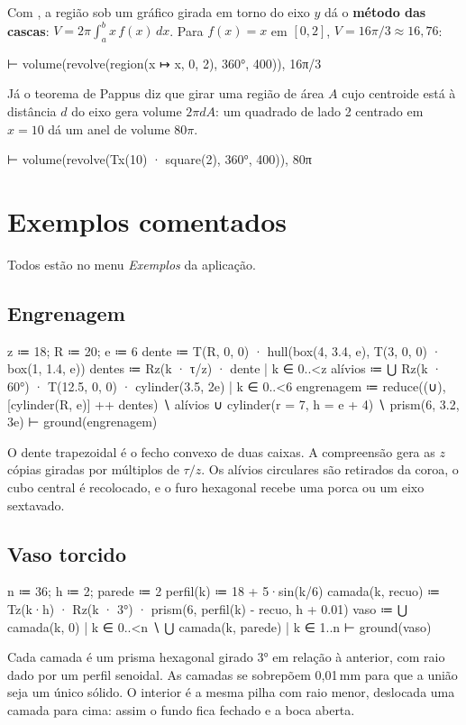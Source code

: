 Com , a região sob um gráfico girada em torno do eixo $y$ dá o \textbf{método das cascas}:
$V = 2\pi\int_a^b x\,f(x)\,dx$. Para $f(x) = x$ em $[0, 2]$, $V = 16\pi/3 \approx 16{,}76$:
\begin{csg}[run]
⊢ volume(revolve(region(x ↦ x, 0, 2), 360°, 400)), 16π/3
\end{csg}
Já o teorema de Pappus diz que girar uma região de área $A$ cujo centroide está à distância $d$ do eixo gera volume
$2\pi d A$: um quadrado de lado 2 centrado em $x = 10$ dá um anel de volume $80\pi$.
\begin{csg}[run]
⊢ volume(revolve(Tx(10) · square(2), 360°, 400)), 80π
\end{csg}

\section{Exemplos comentados}\label{sec:exemplos}
Todos estão no menu \emph{Exemplos} da aplicação.

\subsection{Engrenagem}
\begin{csg}[run, id=gear]
z ≔ 18; R ≔ 20; e ≔ 6
dente  ≔ T(R, 0, 0) · hull(box(4, 3.4, e), T(3, 0, 0) · box(1, 1.4, e))
dentes ≔ { Rz(k · τ/z) · dente | k ∈ 0..<z }
alívios ≔ ⋃{ Rz(k · 60°) · T(12.5, 0, 0) · cylinder(3.5, 2e) | k ∈ 0..<6 }
engrenagem ≔ reduce((∪), [cylinder(R, e)] ++ dentes)
  ∖ alívios ∪ cylinder(r = 7, h = e + 4) ∖ prism(6, 3.2, 3e)
⊢ ground(engrenagem)
\end{csg}
O dente trapezoidal é o fecho convexo de duas caixas. A compreensão gera as $z$ cópias giradas por múltiplos de
$\tau/z$. Os alívios circulares são retirados da coroa, o cubo central é recolocado, e o furo hexagonal recebe uma porca ou um eixo sextavado.

\subsection{Vaso torcido}
\begin{csg}[run, id=vase]
n ≔ 36; h ≔ 2; parede ≔ 2
perfil(k) ≔ 18 + 5·sin(k/6)
camada(k, recuo) ≔ Tz(k·h) · Rz(k · 3°) · prism(6, perfil(k) - recuo, h + 0.01)
vaso ≔ ⋃{ camada(k, 0) | k ∈ 0..<n } ∖ ⋃{ camada(k, parede) | k ∈ 1..n }
⊢ ground(vaso)
\end{csg}
Cada camada é um prisma hexagonal girado 3° em relação à anterior, com raio dado por um perfil senoidal. As camadas se sobrepõem
0,01\,mm para que a união seja um único sólido. O interior é a mesma pilha com raio menor, deslocada uma camada para cima: assim o
fundo fica fechado e a boca aberta.

